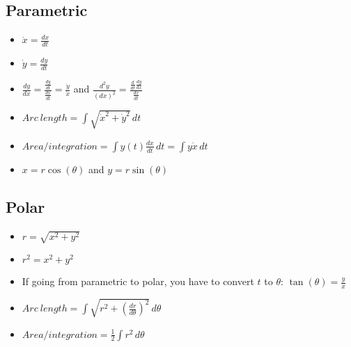 \documentclass{article}
\begin{document}
  \subsection*{\color{BrickRed}Parametric}
  \begin{itemize}
   \Large \item \( \dot{x}=\frac{dx}{dt}\)\\
   \item \( \dot{y}=\frac{dy}{dt}\)\\
   \item
     \(\frac{dy}{dx}=\frac{\frac{dy}{dt}}{\frac{dx}{dt}}=\frac{\dot{y}}{\dot{x}}\) 
      \normalsize and \huge
     \( \frac{d^2y}{\left(dx\right)^2} = \frac{\frac{d}{dt}\frac{dy}{dx}}{\frac{dx}{dt}} \)\\
   \normalsize
   \item \(Arc ~ length = \int\sqrt{\dot{x}^2+\dot{y}^2} \, dt\)\\
   \item \(Area/integration = \int y(t) \frac{dx}{dt} \, dt = \int y \dot{x} \, dt \)\\
   \item \(x=r\cos(\theta)\) and \(y=r\sin(\theta)\)\\
  \end{itemize}
  \subsection*{\color{BrickRed}Polar}
  \begin{itemize}
   \item \(r=\sqrt{x^2+y^2}\)\\
   \item \( r^2=x^2+y^2 \)\\
   \item If going from parametric to polar, you have to convert
      \(t\) to \(\theta\): \(\tan(\theta)=\frac{y}{x}\)\\
   \item \(Arc ~ length = \int \sqrt{r^2+\left( \frac{dr}{d\theta}
     \right)^2} \, d\theta\)
   \item \(Area/integration = \frac{1}{2} \int r^2 \, d\theta \)\\
  \end{itemize}
\end{document}
